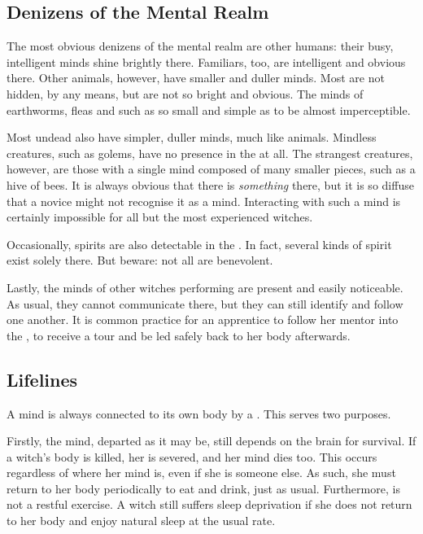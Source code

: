 \subsection{Denizens of the Mental Realm}

The most obvious denizens of the mental realm are other humans: their busy, intelligent minds shine brightly there.
Familiars, too, are intelligent and obvious there.
Other animals, however, have smaller and duller minds.
Most are not hidden, by any means, but are not so bright and obvious.
The minds of earthworms, fleas and such as so small and simple as to be almost imperceptible.

Most undead also have simpler, duller minds, much like animals.
Mindless creatures, such as golems, have no presence in the {\mentalrealm} at all.
The strangest creatures, however, are those with a single mind composed of many smaller pieces, such as a hive of bees.
It is always obvious that there is \emph{something} there, but it is so diffuse that a novice might not recognise it as a mind.
Interacting with such a mind is certainly impossible for all but the most experienced witches.

Occasionally, spirits are also detectable in the {\mentalrealm}.
In fact, several kinds of spirit exist solely there.
But beware: not all are benevolent.

Lastly, the minds of other witches performing  are present and easily noticeable.
As usual, they cannot communicate there, but they can still identify and follow one another.
It is common practice for an apprentice to follow her mentor into the {\mentalrealm}, to receive a tour and be led safely back to her body afterwards.

\subsection{Lifelines}

A mind is always connected to its own body by a {\lifeline}.
This {\lifeline} serves two purposes.

Firstly, the mind, departed as it may be, still depends on the brain for survival.
If a witch's body is killed, her {\lifeline} is severed, and her mind dies too.
This occurs regardless of where her mind is, even if she is {\possessing} someone else.
As such, she must return to her body periodically to eat and drink, just as usual.
Furthermore,  is not a restful exercise.
A witch still suffers sleep deprivation if she does not return to her body and enjoy natural sleep at the usual rate.

